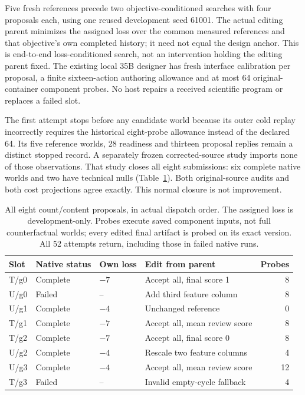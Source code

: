 Five fresh references precede two objective-conditioned searches with four
proposals each, using one reused development seed 61001. The actual editing
parent minimizes the assigned loss over the common measured references and
that objective's own completed history; it need not equal the design anchor.
This is end-to-end loss-conditioned search, not an intervention holding the
editing parent fixed. The existing local 35B designer has fresh interface
calibration per proposal, a finite sixteen-action authoring allowance and
at most 64 original-container component probes. No host repairs a received
scientific program or replaces a failed slot.

The first attempt stops before any candidate world because its outer cold
replay incorrectly requires the historical eight-probe allowance instead of
the declared 64. Its five reference worlds, 28 readiness and thirteen proposal
replies remain a distinct stopped record. A separately frozen corrected-source
study imports none of those observations. That study closes all eight
submissions: six complete native worlds and two have technical nulls
(Table~\ref{tab:native-content-search}). Both original-source audits and both
cost projections agree exactly. This normal closure is not improvement.

\begin{table}[htbp]\centering\small
\caption{All eight count/content proposals, in actual dispatch order.
The assigned loss is development-only. Probes execute saved component inputs,
not full counterfactual worlds; every edited final artifact is probed on its
exact version. All 52 attempts return, including those in failed native runs.}
\label{tab:native-content-search}
\begin{tabular}{@{}llllr@{}}
\toprule Slot & Native status & Own loss & Edit from parent & Probes\\\midrule
T/g0 & Complete & $-7$ & Accept all, final score 1 & 8\\
U/g0 & Failed & -- & Add third feature column & 8\\
U/g1 & Complete & $-4$ & Unchanged reference & 0\\
T/g1 & Complete & $-7$ & Accept all, mean review score & 8\\
T/g2 & Complete & $-7$ & Accept all, final score 0 & 8\\
U/g2 & Complete & $-4$ & Rescale two feature columns & 4\\
U/g3 & Complete & $-4$ & Accept all, mean review score & 12\\
T/g3 & Failed & -- & Invalid empty-cycle fallback & 4\\\bottomrule
\end{tabular}\end{table}

